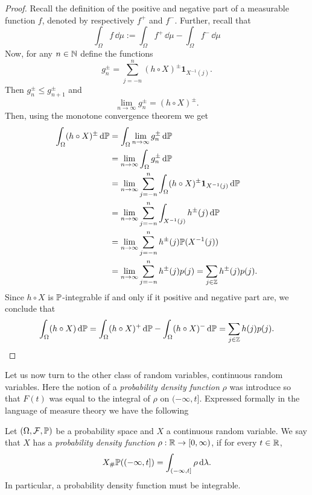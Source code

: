 \begin{proof}
Recall the definition of the positive and negative part of a measurable function $f$, denoted by respectively $f^+$ and $f^-$. Further, recall that 
\[
	\int_\Omega f \, \dd \mu := \int_\Omega f^+ \, \dd \mu - \int_\Omega f^- \, \dd \mu 
\] 
Now, for any $n \in \mathbb N$ define the functions
\[
	g_n^\pm = \sum_{j = -n}^n (h \circ X)^\pm \mathbf{1}_{X^{-1}(j)}.
\]
Then $g_n^\pm \le g_{n+1}^\pm$ and
\[
	\lim_{n \to \infty} g_n^\pm = (h \circ X)^\pm.
\]
Then, using the monotone convergence theorem we get
\begin{align*}
	\int_\Omega (h \circ X)^\pm \, \mathrm{d} \mathbb P &= \int_\Omega \lim_{n \to \infty} g_n^\pm \, \mathrm{d} \mathbb P\\
	&= \lim_{n \to \infty} \int_\Omega g_n^\pm \, \mathrm{d} \mathbb P \\
	&= \lim_{n \to \infty} \sum_{j = -n}^n \int_\Omega (h \circ X)^\pm \mathbf{1}_{X^{-1}(j)} \, \mathrm{d} \mathbb P\\
	&= \lim_{n \to \infty} \sum_{j = -n}^n \int_{X^{-1}(j)} h^\pm(j) \, \mathrm{d} \mathbb P\\
	&= \lim_{n \to \infty} \sum_{j = -n}^n h^\pm(j) \mathbb P(X^{-1}(j)) \\
	&= \lim_{n \to \infty} \sum_{j = -n}^n h^\pm(j) p(j) = \sum_{j \in \mathbb Z} h^\pm(j) p(j).
\end{align*}
Since $h\circ X$ is $\mathbb P$-integrable if and only if it positive and negative part are, we conclude that
\[
	\int_\Omega (h \circ X) \, \mathrm{d} \mathbb P = \int_\Omega (h \circ X)^+ \, \mathrm{d} \mathbb P
	- \int_\Omega (h \circ X)^- \, \mathrm{d} \mathbb P = \sum_{j \in \mathbb Z} h(j) p(j).
\]
\end{proof}

Let us now turn to the other class of random variables, continuous random variables. Here the notion of a \emph{probability density function} $\rho$ was introduce so that $F(t)$ was equal to the integral of $\rho$ on $(-\infty,t]$. Expressed formally in the language of measure theory we have the following

\begin{definition}
Let $(\Omega, \mathcal F, \mathbb{P})$ be a probability space and $X$ a continuous random variable. We say that $X$ has a \emph{probability density function} $\rho : \mathbb R \to [0,\infty)$, if for every $t \in \mathbb R$,
\[
	X_\# \mathbb P((-\infty , t]) = \int_{(-\infty,t]} \rho \, \mathrm{d} \lambda.
\]
In particular, a probability density function must be integrable.
\end{definition}

